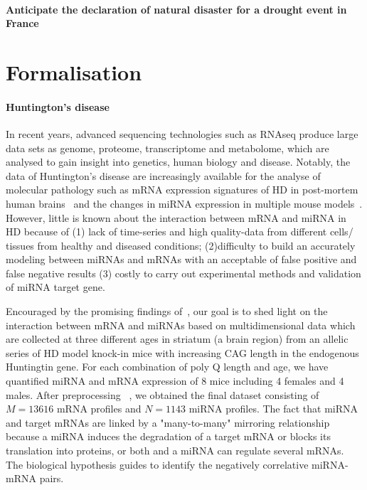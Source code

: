 \paragraph{Anticipate the declaration of natural disaster for a drought event in France}




\section{Formalisation}

\paragraph{Huntington’s disease}
In recent years, advanced sequencing technologies such as RNAseq produce large data sets as genome, proteome, transcriptome and metabolome, which are analysed to gain insight into genetics, human biology and disease. Notably, the data of Huntington's disease are increasingly available for the analyse of  molecular pathology such as  mRNA expression signatures of HD in post-mortem human brains~\cite{Neueder2014, CHA2007228} and the changes in miRNA expression  in multiple mouse models~\cite{Langfelder2018}.  However, little is known about the interaction between mRNA and miRNA in HD because of (1) lack of time-series and high quality-data from different cells/ tissues from healthy and diseased conditions; (2)difficulty to build an accurately modeling between miRNAs and mRNAs with an acceptable of false positive and false negative results (3) costly to carry out experimental methods and validation of miRNA target gene.

Encouraged by the promising findings of~\cite{megret:inserm-02512089, Langfelder2018}, our goal is to shed light on the interaction between mRNA and miRNAs based on multidimensional data which are collected at three different ages in striatum (a brain region) from an allelic series of HD model knock-in mice with increasing CAG length in the endogenous Huntingtin gene.  For each combination of poly Q length and age, we have quantified miRNA and mRNA expression of 8 mice including 4 females and 4 males. After preprocessing ~\cite{megret:inserm-02512089}, we obtained the final dataset consisting of $M= 13 616$ mRNA profiles and $N=1143$ miRNA profiles. The fact that miRNA and target mRNAs are linked by a "many-to-many" mirroring relationship because a miRNA induces the degradation of a target mRNA or blocks its translation into proteins, or both and a miRNA can regulate several mRNAs. The biological hypothesis guides to identify the negatively correlative miRNA-mRNA pairs.

